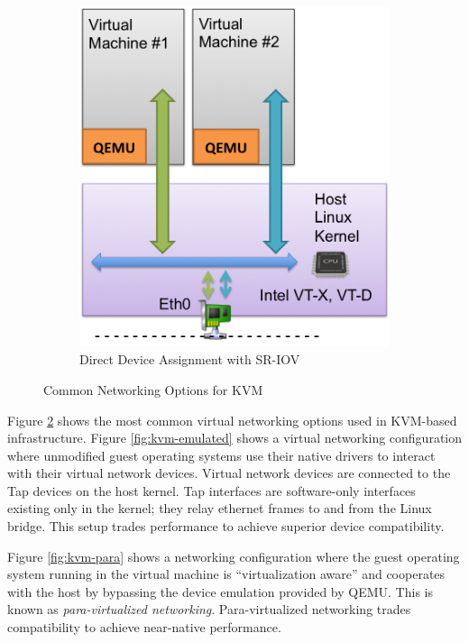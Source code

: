 \begin{enumerate}
\begin{figure}
\begin{subfigure}[b]{0.42\textwidth}
                \includegraphics[width=\textwidth]{kvm-direct-sriov.png}
                \caption{Direct Device Assignment with SR-IOV}
                \label{fig:kvm-direct-sriov}
        \end{subfigure}
        \caption{Common Networking Options for KVM}\label{fig:kvm-networking}
\end{figure} Figure \ref{fig:kvm-networking} shows the most common virtual networking options used in KVM-based infrastructure. Figure \ref{fig:kvm-emulated} shows a virtual networking configuration where unmodified guest operating systems use their native drivers to interact with their virtual network devices. Virtual network devices are connected to the Tap devices \cite{Tap_devices} on the host kernel. Tap interfaces are software-only interfaces existing only in the kernel; they relay ethernet frames to and from the Linux bridge. This setup trades performance to achieve superior device compatibility.



Figure \ref{fig:kvm-para} shows a networking configuration where the guest operating system running in the virtual machine is ``virtualization aware'' and cooperates with the host by bypassing the device emulation provided by QEMU. This is known as \emph{para-virtualized networking}. Para-virtualized networking trades compatibility to achieve near-native performance.




\end{enumerate}
